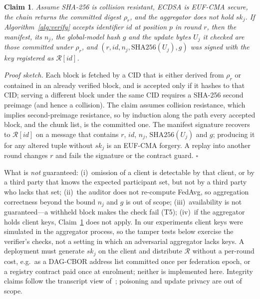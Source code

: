 \documentclass[final,3p,times,twocolumn]{elsarticle}
\newtheorem{claim}{Claim}
\begin{document}
\begin{claim}\label{claim:int}
Assume SHA-256 is collision resistant, ECDSA is EUF-CMA secure, the chain returns the committed digest $\rho_r$, and the aggregator does not hold $sk_j$. If Algorithm~\ref{alg:verify} accepts identifier $\mathit{id}$ at position $p$ in round $r$, then the manifest, its $n_j$, the global-model hash $g$ and the update bytes $U_j$ it checked are those committed under $\rho_r$, and $(r,\mathit{id},n_j,\mathrm{SHA256}(U_j),g)$ was signed with the key registered as $\mathcal{R}[\mathit{id}]$.
\end{claim}
\emph{Proof sketch.} Each block is fetched by a CID that is either derived from $\rho_r$ or contained in an already verified block, and is accepted only if it hashes to that CID; serving a different block under the same CID requires a SHA-256 second preimage (and hence a collision). The claim assumes collision resistance, which implies second-preimage resistance, so by induction along the path every accepted block, and the chunk list, is the committed one. The manifest signature recovers to $\mathcal{R}[\mathit{id}]$ on a message that contains $r$, $\mathit{id}$, $n_j$, $\mathrm{SHA256}(U_j)$ and $g$; producing it for any altered tuple without $sk_j$ is an EUF-CMA forgery. A replay into another round changes $r$ and fails the signature or the contract guard. $\square$

What is \emph{not} guaranteed: (i)~omission of a client is detectable by that client, or by a third party that knows the expected participant set, but not by a third party who lacks that set; (ii)~the auditor does not re-compute FedAvg, so aggregation correctness beyond the bound $n_j$ and $g$ is out of scope; (iii)~availability is not guaranteed---a withheld block makes the check fail (T5); (iv)~if the aggregator holds client keys, Claim~\ref{claim:int} does not apply. In our experiments client keys were simulated in the aggregator process, so the tamper tests below exercise the verifier's checks, not a setting in which an adversarial aggregator lacks keys. A deployment must generate $sk_j$ on the client and distribute $\mathcal{R}$ without a per-round cost, e.g.\ as a DAG-CBOR address list committed once per federation epoch, or a registry contract paid once at enrolment; neither is implemented here. Integrity claims follow the transcript view of~\cite{rizzini}; poisoning and update privacy are out of scope.
\end{document}

